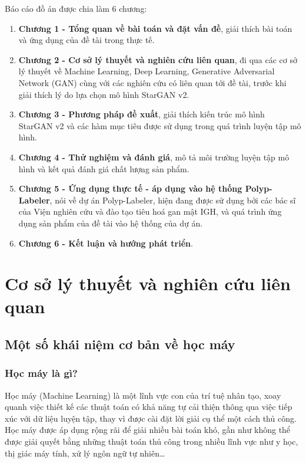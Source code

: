 \documentclass[12pt]{extreport}
\begin{document}
Báo cáo đồ án được chia làm 6 chương:
\begin{enumerate}
    \item \textbf{Chương 1 - Tổng quan về bài toán và đặt vấn đề}, giải thích bài toán và ứng dụng của đề tài trong thực tế.
    \item \textbf{Chương 2 - Cơ sở lý thuyết và nghiên cứu liên quan}, đi qua các cơ sở lý thuyết về Machine Learning, Deep Learning, Generative Adversarial Network (GAN) cùng với các nghiên cứu có liên quan tới đề tài, trước khi giải thích lý do lựa chọn mô hình StarGAN v2.
    \item \textbf{Chương 3 - Phương pháp đề xuất}, giải thích kiến trúc mô hình StarGAN v2 và các hàm mục tiêu được sử dụng trong quá trình luyện tập mô hình.
    \item \textbf{Chương 4 - Thử nghiệm và đánh giá}, mô tả môi trường luyện tập mô hình và kết quả đánh giá chất lượng sản phẩm.
    \item \textbf{Chương 5 - Ứng dụng thực tế - áp dụng vào hệ thống Polyp-Labeler}, nói về dự án Polyp-Labeler, hiện đang được sử dụng bởi các bác sĩ của Viện nghiên cứu và đào tạo tiêu hoá gan mật IGH, và quá trình ứng dụng sản phẩm của đề tài vào hệ thống của dự án.
    \item \textbf{Chương 6 - Kết luận và hướng phát triển}.
\end{enumerate}

\chapter{Cơ sở lý thuyết và nghiên cứu liên quan}

\section{Một số khái niệm cơ bản về học máy}

\subsection{Học máy là gì?}

Học máy (Machine Learning) là một lĩnh vực con của trí tuệ nhân tạo, xoay quanh việc thiết kế các thuật toán có khả năng tự cải thiện thông qua việc tiếp xúc với dữ liệu luyện tập, thay vì được cài đặt lời giải cụ thể một cách thủ công. Học máy được áp dụng rộng rãi để giải nhiều bài toán khó, gần như không thể được giải quyết bằng những thuật toán thủ công trong nhiều lĩnh vực như y học, thị giác máy tính, xử lý ngôn ngữ tự nhiên\dots
\end{document}
